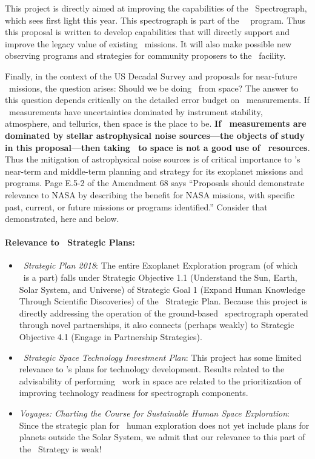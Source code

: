 \documentclass[12pt, letterpaper]{article}
\begin{document}
This project is directly aimed at improving the capabilities of the
\NEID\ Spectrograph, which sees first light this year.
This spectrograph is part of the \NASA\ \NNEXPLORE\ program.
Thus this proposal is written to develop capabilities that will
directly support and improve the legacy value of existing
\NASA\ missions.
It will also make possible new observing programs and strategies for
community proposers to the \NNEXPLORE\ facility.

Finally, in the context of the US Decadal Survey and proposals for near-future
\NASA\ missions, the question arises: Should we be doing \EPRV\ from space?
The answer to this question depends critically on the detailed error budget on
\EPRV\ measurements.
If \EPRV\ measurements have uncertainties dominated by instrument
stability, atmosphere, and tellurics, then space is the place to be.
\textbf{If \EPRV\ measurements are dominated by stellar astrophysical
  noise sources---the objects of study in this proposal---then taking
  \EPRV\ to space is not a good use of \NASA\ resources}.
Thus the mitigation of astrophysical noise sources is of critical
importance to \NASA's near-term and middle-term planning and strategy
for its exoplanet missions and programs.
Page E.5-2 of the  Amendment 68 says ``Proposals
should demonstrate relevance to NASA by describing the benefit for
NASA missions, with specific past, current, or future missions or
programs identified.''  Consider that demonstrated, here and below.

\paragraph{Relevance to \NASA\ Strategic Plans:}
\begin{itemize}
\item
\textit{\NASA\ Strategic Plan 2018}:
The entire Exoplanet Exploration program (of which \XRP\ is a part) falls under
Strategic Objective 1.1 (Understand the Sun, Earth, Solar System, and Universe)
of Strategic Goal 1 (Expand Human Knowledge Through Scientific Discoveries) of the
\NASA\ Strategic Plan.
Because this project is directly addressing the operation of the
ground-based \NNEXPLORE\ spectrograph operated through novel
partnerships, it also connects (perhaps weakly) to Strategic Objective
4.1 (Engage in Partnership Strategies).
\item
\textit{\NASA\ Strategic Space Technology Investment Plan}:
This project has some limited relevance to \NASA's plans for technology development.
Results related to the advisability of performing \EPRV\ work in space are related to
the prioritization of improving technology readiness for spectrograph components.
\item
\textit{Voyages: Charting the Course for Sustainable Human Space Exploration}:
Since the strategic plan for \NASA\ human exploration does not yet include plans
for planets outside the Solar System, we admit that our relevance to this part
of the \NASA\ Strategy is weak!
\end{itemize}
\end{document}
